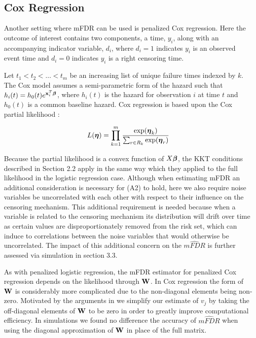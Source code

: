 \subsection{Cox Regression}

Another setting where mFDR can be used is penalized Cox regression. Here the outcome of interest contains two components, a time, $y_i$, along with an accompanying indicator variable, $d_i$, where $d_i = 1$ indicates $y_i$ is an observed event time and $d_i = 0$ indicates $y_i$ is a right censoring time.

Let $t_1 < t_2 < \ldots < t_m$ be an increasing list of unique failure times indexed by $k$. The Cox model assumes a semi-parametric form of the hazard such that $h_i(t) = h_0(t)e^{\mathbf{x}_i^T \boldsymbol{\beta}}$, where $h_i(t)$ is the hazard for observation $i$ at time $t$ and $h_0(t)$ is a common baseline hazard. Cox regression is based upon the Cox partial likelihood \citep{Cox1972}:

\begin{equation*}
L(\boldsymbol{\eta})  = \prod_{k=1}^{m} \frac{\exp(\boldsymbol{\eta}_k)}{\sum_{r \in R_k} \exp(\boldsymbol{\eta}_r) } 
\end{equation*}

Because the partial likelihood is a convex function of $X\boldsymbol{\beta}$, the KKT conditions described in Section 2.2 apply in the same way which they applied to the full likelihood in the logistic regression case. Although when estimating mFDR an additional consideration is necessary for (A2) to hold, here we also require noise variables be uncorrelated with each other with respect to their influence on the censoring mechanism. This additional requirement is needed because when a variable is related to the censoring mechanism its distribution will drift over time as certain values are disproportionately removed from the risk set, which can induce to correlations between the noise variables that would otherwise be uncorrelated. The impact of this additional concern on the $\widehat{mFDR}$ is further assessed via simulation in section 3.3. 

As with penalized logistic regression, the mFDR estimator for penalized Cox regression depends on the likelihood through $\mathbf{W}$. In Cox regression the form of $\mathbf{W}$ is considerably more complicated due to the non-diagonal elements being non-zero. Motivated by the arguments in \citet{Simon2011} we simplify our estimate of $v_j$ by taking the off-diagonal elements of $\mathbf{W}$ to be zero in order to greatly improve computational efficiency. In simulations we found no difference the accuracy of $\widehat{mFDR}$ when using the diagonal approximation of $\mathbf{W}$ in place of the full matrix.

